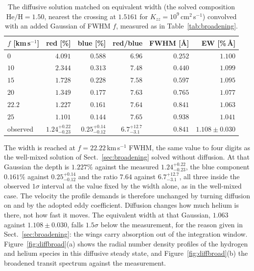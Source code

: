 \documentclass[english,a4paper]{my_memo}
\begin{document}
\begin{table}[htbp]\centering
\caption{The diffusive solution matched on equivalent width (the solved
composition $\mathrm{He/H} = 1.50$, nearest the crossing at $1.5161$ for
$K_{zz} = 10^{9}$\,cm$^2$\,s$^{-1}$) convolved with an added Gaussian of
FWHM $f$, measured as in Table~\ref{tab:broadening}.}
\label{tab:diffbroad}
\begin{tabular}{lrrrrr}
\toprule
$f$ [km\,s$^{-1}$] & red [\%] & blue [\%] & red/blue & FWHM [\AA] &
EW [\%\,\AA] \\
\midrule
$0$   & $4.091$ & $0.588$ & $6.96$ & $0.252$ & $1.100$ \\
$10$  & $2.344$ & $0.313$ & $7.48$ & $0.440$ & $1.099$ \\
$15$  & $1.728$ & $0.228$ & $7.58$ & $0.597$ & $1.095$ \\
$20$  & $1.349$ & $0.177$ & $7.63$ & $0.765$ & $1.077$ \\
$\mathbf{22.2}$ & $\mathbf{1.227}$ & $\mathbf{0.161}$ & $\mathbf{7.64}$ &
$\mathbf{0.841}$ & $\mathbf{1.063}$ \\
$25$  & $1.101$ & $0.144$ & $7.65$ & $0.938$ & $1.041$ \\
\midrule
observed & $1.24^{+0.22}_{-0.23}$ & $0.25^{+0.14}_{-0.12}$ &
$6.7^{+12.7}_{-3.1}$ & $0.841$ & $1.108 \pm 0.030$ \\
\bottomrule
\end{tabular}
\end{table}

The width is reached at $f = 22.22$\,km\,s$^{-1}$ FWHM, the same value to
four digits as the well-mixed solution of Sect.~\ref{sec:broadening} solved
without diffusion. At that Gaussian the depth is $1.227\%$ against the
measured $1.24^{+0.22}_{-0.23}$, the blue component $0.161\%$ against
$0.25^{+0.14}_{-0.12}$ and the ratio $7.64$ against $6.7^{+12.7}_{-3.1}$, all
three inside the observed $1\sigma$ interval at the value fixed by the width
alone, as in the well-mixed case. The velocity the profile demands is
therefore unchanged by turning diffusion on and by the adopted eddy
coefficient. Diffusion changes how much helium is there, not how fast it
moves. The equivalent width at that Gaussian, $1.063$ against
$1.108 \pm 0.030$, falls $1.5\sigma$ below the measurement, for the reason
given in Sect.~\ref{sec:broadening}: the wings carry absorption out of the
integration window. Figure~\ref{fig:diffbroad}(a) shows the radial number density profiles of the
hydrogen and helium species in this diffusive steady state, and
Figure~\ref{fig:diffbroad}(b) the broadened transit spectrum against the
measurement.
\end{document}
